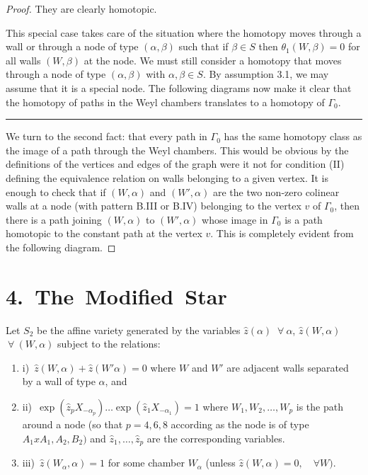 \documentclass{memo-l}
\theoremstyle{definition}
\theoremstyle{remark}
\numberwithin{section}{chapter}
\numberwithin{equation}{chapter}
\begin{document}
\begin{proof}
\medskip
\medskip


\noindent
They are clearly homotopic.

   This special case takes care of the situation where the homotopy moves
through a wall or through a node of type $({\alpha},{\beta})$ such that if
${\beta}  \in  S$ then ${\theta}_{1}(W,{\beta}) = 0$ for all walls
$(W,{\beta})$ at the node.  We must still consider a homotopy that moves
through a node of type $({\alpha},{\beta})$ with ${\alpha},{\beta}  \in 
S$.  By assumption  3.1, we may assume that it is a special node.  The
following diagrams now make it clear that the homotopy of paths in the Weyl
chambers translates to a homotopy of ${\Gamma}_{0}$. 

\medskip
\medskip
\hrule\medskip
\medskip


We turn to the second fact: that every path in ${\Gamma}_{0}$ has the same
homotopy class as the image of a path through the Weyl chambers.  This
would be obvious by the definitions of the vertices and edges of the graph
were it not for condition (II) defining the equivalence relation on walls
belonging to a given vertex.  It is enough to check that if $(W,{\alpha})$
and $(W',{\alpha})$ are the two non-zero colinear walls at a node (with
pattern B.III or B.IV) belonging to the vertex $v$ of ${\Gamma}_{0}$,
then there is a path joining $(W,{\alpha})$ to $(W',{\alpha})$ whose image
in ${\Gamma}_{0}$ is a path homotopic to the constant path at the vertex
$v$.  This is completely evident from the following diagram.

\medskip
\medskip
\end{proof}

\section{4.\  The\ Modified\ Star}

   Let $S_{2}$ be the affine variety generated by the variables $\hat
z({\alpha})$ ${\ \forall\ } {\alpha}$, $\hat z(W,{\alpha})$ ${\ \forall\ }
(W,{\alpha})$ subject to the relations:
\begin{enumerate}
\item{i)}\ $\hat z(W,{\alpha})+\hat z(W'{\alpha}) = 0$ where $W$ and $W'$ are
adjacent walls separated by a wall of type ${\alpha}$, and
\item{ii)}\ $\exp(\hat z_{p}X_{-{\alpha}_{p}})\ldots \exp(\hat z_{1}X_{-{\alpha}_{1}}) 
= 1$ where $W_{1},W_{2},\ldots ,W_{p}$ is the path around
a node (so that $p = 4,6,8$ according as the node is of type $A_{1}xA_{1},
A_{2}, B_{2})$ and $\hat z_{1},\ldots ,\hat z_{p}$ are the corresponding
variables.
\item{iii)}\ $\hat z(W_{{\alpha}},{\alpha}) = 1$ 
for some chamber $W_\alpha$ (unless $\hat z(W,\alpha)=0,\quad \forall W)$.
\end{enumerate}
\end{document}
